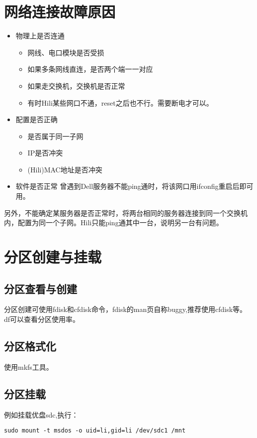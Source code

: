 \section{网络连接故障原因}
\begin{itemize}
    \item 物理上是否连通
        \begin{itemize}
            \item 网线、电口模块是否受损
            \item 如果多条网线直连，是否两个端一一对应
            \item 如果走交换机，交换机是否正常
            \item 有时Hili某些网口不通，reset之后也不行。需要断电才可以。

        \end{itemize}
    \item 配置是否正确
        \begin{itemize}
            \item 是否属于同一子网
            \item IP是否冲突
            \item (Hili)MAC地址是否冲突
        \end{itemize}
    \item 软件是否正常
        曾遇到Dell服务器不能ping通时，将该网口用ifconfig重启后即可用。
        
\end{itemize}

另外，不能确定某服务器是否正常时，将两台相同的服务器连接到同一个交换机内，配置为同一个子网。Hili只能ping通其中一台，说明另一台有问题。
\section{分区创建与挂载}

\subsection{分区查看与创建}
分区创建可使用fdisk和cfdisk命令，fdisk的man页自称buggy,推荐使用cfdisk等。
df可以查看分区使用率。

\subsection{分区格式化}
使用mkfs工具。

\subsection{分区挂载}
例如挂载优盘sdc,执行：
\begin{verbatim}
sudo mount -t msdos -o uid=li,gid=li /dev/sdc1 /mnt
\end{verbatim}


